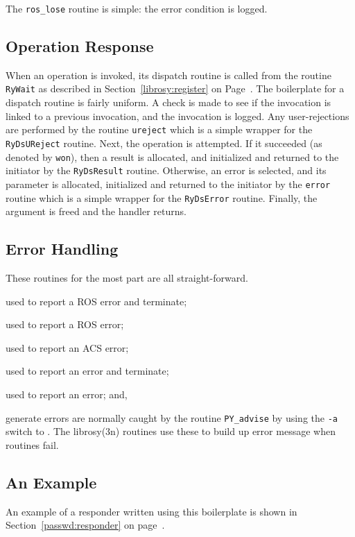 The \verb"ros_lose" routine is simple:
the error condition is logged.

\newpage

\subsection	{Operation Response}
When an operation is invoked,
its dispatch routine is called from the routine \verb"RyWait"
as described in Section~\ref{librosy:register} on
Page~\pageref{librosy:register}.
The boilerplate for a dispatch routine is fairly uniform.
A check is made to see if the invocation is linked to a previous invocation,
and the invocation is logged.
Any user-rejections are performed by the routine \verb"ureject" which is a
simple wrapper for the \verb"RyDsUReject" routine.
Next, the operation is attempted.
If it succeeded (as denoted by \verb"won"),
then a result is allocated, and initialized and returned to the initiator by
the \verb"RyDsResult" routine.
Otherwise,
an error is selected,
and
its parameter is allocated, initialized and returned to the initiator by the
\verb"error" routine which is a simple wrapper for the \verb"RyDsError"
routine.
Finally,
the argument is freed and the handler returns.

\newpage

\subsection	{Error Handling}
These routines for the most part are all straight-forward.
\begin{describe}
\item[\verb"ros\_adios":] used to report a ROS error and terminate;

\item[\verb"ros\_advise":] used to report a ROS error;

\item[\verb"acs\_advise":] used to report an ACS error;

\item[\verb"adios":] used to report an error and terminate;

\item[\verb"advise":] used to report an error;
and,

\end{describe}
 generate errors are normally caught by the routine
\verb"PY_advise" by using the \verb"-a" switch to
. The \man librosy(3n) routines use these to build up error
message when  routines fail.

\newpage

\subsection	{An Example}
An example of a responder written using this boilerplate is
shown in Section~\ref{passwd:responder} on page~\pageref{passwd:responder}.
